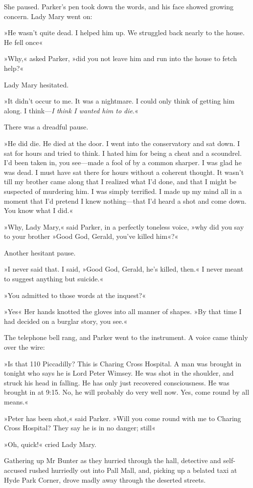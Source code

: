 She paused. Parker's pen took down the words, and his face showed growing concern. Lady Mary went on:

»He wasn't quite dead. I helped him up. We struggled back nearly to the house. He fell once\longdash«

»Why,« asked Parker, »did you not leave him and run into the house to fetch help?«

Lady Mary hesitated.

»It didn't occur to me. It was a nightmare. I could only think of getting him along. I think—\textit{I think I wanted him to die}.«

There was a dreadful pause.

»He did die. He died at the door. I went into the conservatory and sat down. I sat for hours and tried to think. I hated him for being a cheat and a scoundrel. I'd been taken in, you see—made a fool of by a common sharper. I was glad he was dead. I must have sat there for hours without a coherent thought. It wasn't till my brother came along that I realized what I'd done, and that I might be suspected of murdering him. I was simply terrified. I made up my mind all in a moment that I'd pretend I knew nothing—that I'd heard a shot and come down. You know what I did.«

»Why, Lady Mary,« said Parker, in a perfectly toneless voice, »why did you say to your brother »Good God, Gerald, you've killed him«?«

Another hesitant pause.

»I never said that. I said, »Good God, Gerald, he's killed, then.« I never meant to suggest anything but suicide.«

»You admitted to those words at the inquest?«

»Yes\longdash« Her hands knotted the gloves into all manner of shapes. »By that time I had decided on a burglar story, you see.«

The telephone bell rang, and Parker went to the instrument. A voice came thinly over the wire:

»Is that 110 Piccadilly? This is Charing Cross Hospital. A man was brought in tonight who says he is Lord Peter Wimsey. He was shot in the shoulder, and struck his head in falling. He has only just recovered consciousness. He was brought in at 9:15. No, he will probably do very well now. Yes, come round by all means.«

»Peter has been shot,« said Parker. »Will you come round with me to Charing Cross Hospital? They say he is in no danger; still\longdash«

»Oh, quick!« cried Lady Mary.

Gathering up Mr Bunter as they hurried through the hall, detective and self-accused rushed hurriedly out into Pall Mall, and, picking up a belated taxi at Hyde Park Corner, drove madly away through the deserted streets.
